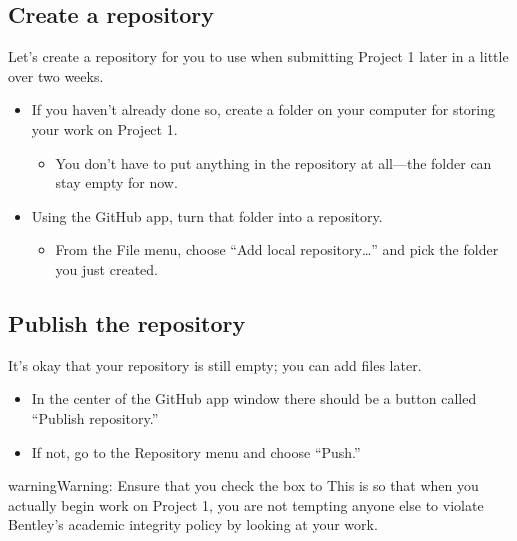 \documentclass[letterpaper,10pt,english]{sphinxmanual}
\begin{document}
\subsection{Create a repository}
\label{\detokenize{chapter-8-version-control:create-a-repository}}
Let’s create a repository for you to use when submitting Project 1 later in a little over two weeks.
\begin{itemize}
\item {} 
If you haven’t already done so, create a folder on your computer for storing your work on Project 1.
\begin{itemize}
\item {} 
You don’t have to put anything in the repository at all—the folder can stay empty for now.

\end{itemize}

\item {} 
Using the GitHub app, turn that folder into a repository.
\begin{itemize}
\item {} 
From the File menu, choose “Add local repository…” and pick the folder you just created.

\end{itemize}

\end{itemize}


\subsection{Publish the repository}
\label{\detokenize{chapter-8-version-control:publish-the-repository}}
It’s okay that your repository is still empty; you can add files later.
\begin{itemize}
\item {} 
In the center of the GitHub app window there should be a button called “Publish repository.”

\item {} 
If not, go to the Repository menu and choose “Push.”

\end{itemize}

\begin{sphinxadmonition}{warning}{Warning:}
Ensure that you check the box to   This is so that when you actually begin work on Project 1, you are not tempting anyone else to violate Bentley’s academic integrity policy by looking at your work.
\end{sphinxadmonition}
\end{document}
